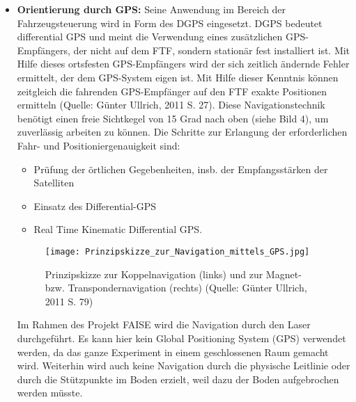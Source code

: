 \begin{itemize}
	\item \textbf{Orientierung durch GPS:} Seine Anwendung im Bereich der Fahrzeugsteuerung wird in Form des DGPS eingesetzt.
DGPS bedeutet differential GPS und meint die Verwendung eines zus\"atzlichen GPS-Empf\"angers, der nicht auf dem FTF, sondern station\"ar fest installiert ist.
Mit Hilfe dieses ortsfesten GPS-Empf\"angers wird der sich zeitlich \"andernde Fehler ermittelt, der dem GPS-System eigen ist.
Mit Hilfe dieser Kenntnis k\"onnen zeitgleich die fahrenden GPS-Empf\"anger auf den FTF exakte Positionen ermitteln (Quelle: G\"unter Ullrich, 2011 S. 27).
Diese Navigationstechnik benötigt einen freie Sichtkegel von 15 Grad nach oben (siehe Bild 4), um zuverl\"assig arbeiten zu k\"onnen.
Die Schritte zur Erlangung der erforderlichen Fahr- und Positioniergenauigkeit sind:
	\begin{itemize}
		\item Pr\"ufung der \"ortlichen Gegebenheiten, insb. der Empfangsst\"arken der Satelliten
 \item Einsatz des Differential-GPS
 \item Real Time Kinematic Differential GPS. 
\end{itemize}
	\begin{figure}[h!]
		\centering
		\texttt{[image: Prinzipskizze\_zur\_Navigation\_mittels\_GPS.jpg]}
		\caption{Prinzipskizze zur Koppelnavigation (links) und zur Magnet- bzw. Transpondernavigation (rechts) (Quelle: G\"unter Ullrich, 2011 S. 79)}
		\label{Systemarchitektur_FTS}
\end{figure}
Im Rahmen des Projekt FAISE wird die Navigation durch den Laser durchgef\"uhrt. Es kann hier kein Global Positioning System (GPS) verwendet werden, da das ganze Experiment in einem geschlossenen Raum gemacht wird.
Weiterhin wird auch keine Navigation durch die physische Leitlinie oder durch die St\"utzpunkte im Boden erzielt, weil dazu der Boden aufgebrochen werden m\"usste.
\end{itemize}


